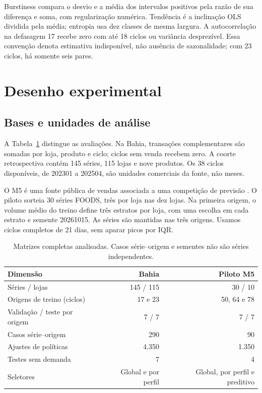\documentclass[preprint,12pt]{elsarticle}
\begin{document}
Burstiness compara o desvio e a média dos intervalos positivos pela razão de sua diferença e soma, com regularização numérica. Tendência é a inclinação OLS dividida pela média; entropia usa dez classes de mesma largura. A autocorrelação na defasagem 17 recebe zero com até 18 ciclos ou variância desprezível. Essa convenção denota estimativa indisponível, não ausência de sazonalidade; com 23 ciclos, há somente seis pares.

\section{Desenho experimental}
\subsection{Bases e unidades de análise}
A Tabela~\ref{tab:datasets} distingue as avaliações. Na Bahia, transações complementares são somadas por loja, produto e ciclo; ciclos sem venda recebem zero. A coorte retrospectiva contém 145 séries, 115 lojas e nove produtos. Os 38 ciclos disponíveis, de 202301 a 202504, são unidades comerciais da fonte, não meses.

O M5 é uma fonte pública de vendas associada a uma competição de previsão \cite{Makridakis2022M5Accuracy}. O piloto sorteia 30 séries FOODS, três por loja nas dez lojas. Na primeira origem, o volume médio do treino define três estratos por loja, com uma escolha em cada estrato e semente 20261015. As séries são mantidas nas três origens. Usamos ciclos completos de 21 dias, sem aparar picos por IQR.

\begin{table}[htbp]\centering\small
\caption{Matrizes completas analisadas. Casos série--origem e sementes não são séries independentes.}\label{tab:datasets}
\begin{tabular}{@{}lrr@{}}\toprule
Dimensão & Bahia & Piloto M5\\\midrule
Séries / lojas & 145 / 115 & 30 / 10\\
Origens de treino (ciclos) & 17 e 23 & 50, 64 e 78\\
Validação / teste por origem & 7 / 7 & 7 / 7\\
Casos série--origem & 290 & 90\\
Ajustes de políticas & 4.350 & 1.350\\
Testes sem demanda & 7 & 4\\
Seletores & Global e por perfil & Global, por perfil e preditivo\\\bottomrule
\end{tabular}\end{table}
\end{document}
